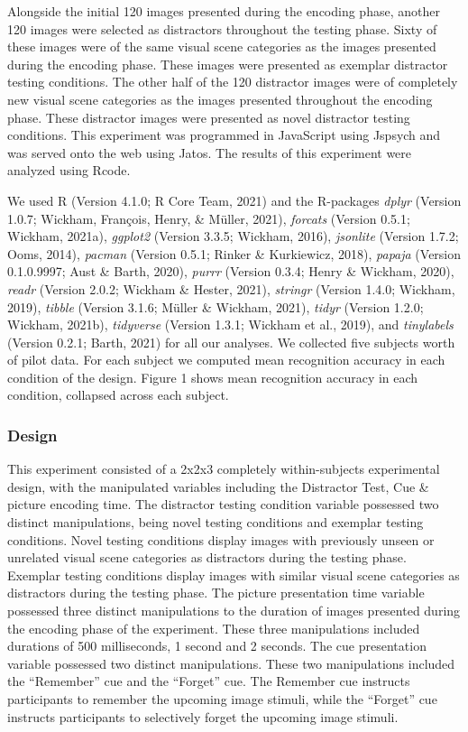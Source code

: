 \documentclass[
  man,floatsintext]{apa6}
\begin{document}
Alongside the initial 120 images presented during the encoding phase, another 120 images were selected as distractors throughout the testing phase. Sixty of these images were of the same visual scene categories as the images presented during the encoding phase. These images were presented as exemplar distractor testing conditions. The other half of the 120 distractor images were of completely new visual scene categories as the images presented throughout the encoding phase. These distractor images were presented as novel distractor testing conditions. This experiment was programmed in JavaScript using Jspsych and was served onto the web using Jatos. The results of this experiment were analyzed using Rcode.

We used R (Version 4.1.0; R Core Team, 2021) and the R-packages \emph{dplyr} (Version 1.0.7; Wickham, François, Henry, \& Müller, 2021), \emph{forcats} (Version 0.5.1; Wickham, 2021a), \emph{ggplot2} (Version 3.3.5; Wickham, 2016), \emph{jsonlite} (Version 1.7.2; Ooms, 2014), \emph{pacman} (Version 0.5.1; Rinker \& Kurkiewicz, 2018), \emph{papaja} (Version 0.1.0.9997; Aust \& Barth, 2020), \emph{purrr} (Version 0.3.4; Henry \& Wickham, 2020), \emph{readr} (Version 2.0.2; Wickham \& Hester, 2021), \emph{stringr} (Version 1.4.0; Wickham, 2019), \emph{tibble} (Version 3.1.6; Müller \& Wickham, 2021), \emph{tidyr} (Version 1.2.0; Wickham, 2021b), \emph{tidyverse} (Version 1.3.1; Wickham et al., 2019), and \emph{tinylabels} (Version 0.2.1; Barth, 2021) for all our analyses. We collected five subjects worth of pilot data. For each subject we computed mean recognition accuracy in each condition of the design. Figure 1 shows mean recognition accuracy in each condition, collapsed across each subject.

\hypertarget{design}{%
\subsubsection{Design}\label{design}}

This experiment consisted of a 2x2x3 completely within-subjects experimental design, with the manipulated variables including the Distractor Test, Cue \& picture encoding time. The distractor testing condition variable possessed two distinct manipulations, being novel testing conditions and exemplar testing conditions. Novel testing conditions display images with previously unseen or unrelated visual scene categories as distractors during the testing phase. Exemplar testing conditions display images with similar visual scene categories as distractors during the testing phase. The picture presentation time variable possessed three distinct manipulations to the duration of images presented during the encoding phase of the experiment. These three manipulations included durations of 500 milliseconds, 1 second and 2 seconds. The cue presentation variable possessed two distinct manipulations. These two manipulations included the ``Remember'' cue and the ``Forget'' cue. The Remember cue instructs participants to remember the upcoming image stimuli, while the ``Forget'' cue instructs participants to selectively forget the upcoming image stimuli.
\end{document}
